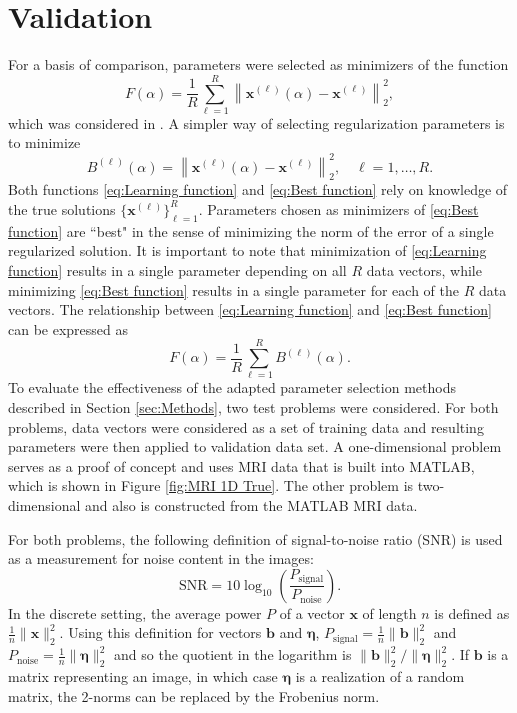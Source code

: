 \documentclass[12pt]{article}
\newcommand{\bVec}{\mathbf{b}}	%
\newcommand{\xVec}{\mathbf{x}}	%
\newcommand{\regparam}{\alpha}  %
\newcommand{\noise}{\eta}	%
\newcommand{\noiseVec}{\bm{\noise}}	%
\begin{document}
\section{Validation} \label{sec:Validation}
For a basis of comparison, parameters were selected as minimizers of the function
\begin{equation}
\label{eq:Learning function}
F(\regparam) = \frac{1}{R}\sum_{\ell=1}^R \left\|\xVec^{(\ell)}(\regparam) - \xVec^{(\ell)}\right\|_2^2,
\end{equation} 
which was considered in \cite{ChungEspanol2017}. A simpler way of selecting regularization parameters is to minimize
\begin{equation}
\label{eq:Best function}
B^{(\ell)}(\regparam) = \left\|\xVec^{(\ell)}(\regparam) - \xVec^{(\ell)}\right\|_2^2, \quad \ell = 1,\ldots,R.
\end{equation}
Both functions \eqref{eq:Learning function} and \eqref{eq:Best function} rely on knowledge of the true solutions $\{\xVec^{(\ell)}\}_{\ell=1}^R$. Parameters chosen as minimizers of \eqref{eq:Best function} are ``best" in the sense of minimizing the norm of the error of a single regularized solution. It is important to note that minimization of \eqref{eq:Learning function} results in a single parameter depending on all $R$ data vectors, while minimizing \eqref{eq:Best function} results in a single parameter for each of the $R$ data vectors. The relationship between \eqref{eq:Learning function} and \eqref{eq:Best function} can be expressed as
\[F(\regparam) = \frac{1}{R}\sum_{\ell=1}^R B^{(\ell)}(\regparam).\]
\indent To evaluate the effectiveness of the adapted parameter selection methods described in Section \ref{sec:Methods}, two test problems were considered. For both problems, data vectors were considered as a set of training data and resulting parameters were then applied to validation data set. A one-dimensional problem serves as a proof of concept and uses MRI data that is built into MATLAB, which is shown in Figure \ref{fig:MRI 1D True}. The other problem is two-dimensional and also is constructed from the MATLAB MRI data. \par
For both problems, the following definition of signal-to-noise ratio (SNR) is used as a measurement for noise content in the images:
\begin{equation}
\label{eq:SNR}
\text{SNR} = 10\log_{10}\left(\frac{P_{\text{signal}}}{P_{\text{noise}}}\right).
\end{equation}
In the discrete setting, the average power $P$ of a vector $\xVec$ of length $n$ is defined as $\frac{1}{n}\|\xVec\|^2_2$. Using this definition for vectors $\bVec$ and $\noiseVec$, $P_{\text{signal}} = \frac{1}{n}\|\bVec\|^2_2$ and $P_{\text{noise}} = \frac{1}{n}\|\noiseVec\|^2_2$ and so the quotient in the logarithm is $\|\bVec\|_2^2/\|\noiseVec\|_2^2$. If $\bVec$ is a matrix representing an image, in which case $\noiseVec$ is a realization of a random matrix, the 2-norms can be replaced by the Frobenius norm.
\end{document}
